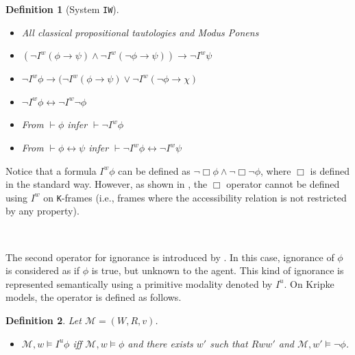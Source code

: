 \documentclass{article}
\newtheorem{defi}{Definition}
\begin{document}
\begin{defi}[System \texttt{IW}]

\

\begin{itemize}

\item[(CPL)] All classical propositional tautologies and Modus Ponens

\item[(A1$_{IW}$)] $(\neg I^{w} (\phi \rightarrow \psi) \wedge \neg I^{w} (\neg \phi \rightarrow \psi)) \rightarrow \neg I^{w} \psi$

\item[(A2$_{IW}$)] $\neg I^{w} \phi \rightarrow (\neg I^{w}(\phi \rightarrow \psi) \vee \neg I^{w}(\neg \phi \rightarrow \chi)$

\item[(A3$_{IW}$)] $\neg I^{w} \phi \leftrightarrow \neg I^{w} \neg \phi$

\item[(NEC$_{IW}$)] From $\vdash \phi$ infer $\vdash \neg I^{w} \phi$

\item[(RE$_{IW}$)] From $\vdash \phi \leftrightarrow \psi$ infer $\vdash \neg I^{w} \phi \leftrightarrow \neg I^{w} \psi$


\end{itemize}


\end{defi}

Notice that a formula $I^{w} \phi$ can be defined as $\neg \Box \phi \wedge \neg \Box \neg \phi$, where $\Box$ is defined in the standard way. However, as shown in  \citep{Fan2015}, the $\Box$ operator cannot be defined using $I^{w}$ on \texttt{K}-frames (i.e., frames where the accessibility relation is not restricted by any property).



\

The second operator for ignorance is introduced by \citet{Steinsvold2008}. In this case, ignorance of $\phi$ is considered as if $\phi$ is true, but unknown to the agent. This kind of ignorance is represented semantically using a primitive modality denoted by $I^{u}$. On Kripke models, the operator is defined as follows.

\begin{defi} Let $\mathcal{M} = (W, R, v)$.

\begin{itemize}

\item $\mathcal{M}, w \models I^{u} \phi$ iff $\mathcal{M}, w \models \phi$ and there exists $w'$ such that $Rww'$ and $\mathcal{M}, w' \models \neg \phi$.

\end{itemize}

\end{defi}
\end{document}
